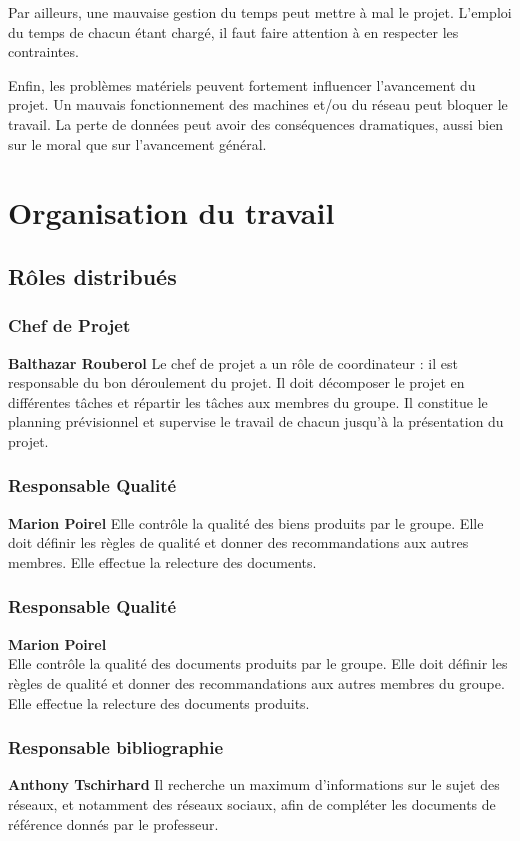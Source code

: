 Par ailleurs, une mauvaise gestion du temps peut mettre à mal le projet. L'emploi du temps de chacun étant chargé, il faut faire attention à en respecter les contraintes.

Enfin, les problèmes matériels peuvent fortement influencer l'avancement du projet. Un mauvais fonctionnement des machines et/ou du réseau peut bloquer le travail. La perte de données peut avoir des conséquences dramatiques, aussi bien sur le moral que sur l'avancement général.

\section{Organisation du travail}
\subsection{Rôles distribués}

\subsubsection{Chef de Projet}
\textbf{Balthazar Rouberol}
Le chef de projet a un rôle de coordinateur : il est responsable du bon déroulement du projet. Il doit décomposer le projet en différentes tâches et répartir les tâches aux membres du groupe. Il constitue le planning prévisionnel et supervise le travail de chacun jusqu'à la présentation du projet.
  
\subsubsection{Responsable Qualité}
\textbf{Marion Poirel}
Elle contrôle la qualité des biens produits par le groupe. Elle doit définir les règles de qualité et donner des recommandations aux autres membres. Elle effectue la relecture des documents.

  
\subsubsection{Responsable Qualité}
\textbf{Marion Poirel}\\
Elle contrôle la qualité des documents produits par le groupe. Elle doit définir les règles de qualité et donner des recommandations aux autres membres du groupe. Elle effectue la relecture des documents produits.

\subsubsection{Responsable bibliographie}
\textbf{Anthony Tschirhard}
Il recherche un maximum d'informations sur le sujet des réseaux, et notamment des réseaux sociaux, afin de compléter les documents de référence donnés par le professeur.

